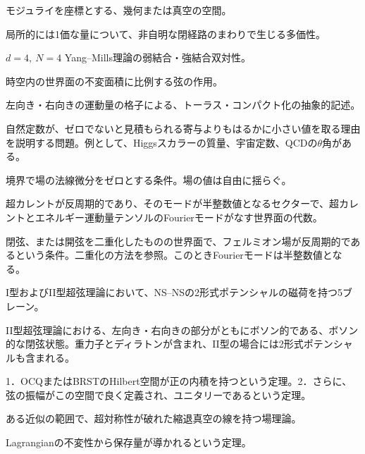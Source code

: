 {モジュライを座標とする、幾何または真空の空間。}

{局所的には1価な量について、非自明な閉経路のまわりで生じる多価性。}

{$d=4,\ N=4$ Yang--Mills理論の弱結合・強結合双対性。}

{時空内の世界面の不変面積に比例する弦の作用。}

{左向き・右向きの運動量の格子による、トーラス・コンパクト化の抽象的記述。}

{自然定数が、ゼロでないと見積もられる寄与よりもはるかに小さい値を取る理由を説明する問題。例として、Higgsスカラーの質量、宇宙定数、QCDの$\theta$角がある。}

{境界で場の法線微分をゼロとする条件。場の値は自由に揺らぐ。}

{超カレントが反周期的であり、そのモードが半整数値となるセクターで、超カレントとエネルギー運動量テンソルのFourierモードがなす世界面の代数。}

{閉弦、または開弦を二重化したものの世界面で、フェルミオン場が反周期的であるという条件。二重化の方法を参照。このときFourierモードは半整数値となる。}

{I型およびII型超弦理論において、NS--NSの2形式ポテンシャルの磁荷を持つ5ブレーン。}

{II型超弦理論における、左向き・右向きの部分がともにボソン的である、ボソン的な閉弦状態。重力子とディラトンが含まれ、II型の場合には2形式ポテンシャルも含まれる。}

{1．OCQまたはBRSTのHilbert空間が正の内積を持つという定理。2．さらに、弦の振幅がこの空間で良く定義され、ユニタリーであるという定理。}

{ある近似の範囲で、超対称性が破れた縮退真空の線を持つ場理論。}

{Lagrangianの不変性から保存量が導かれるという定理。}

